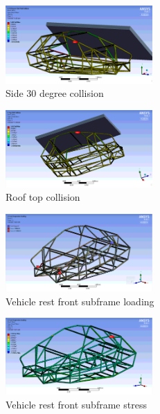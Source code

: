 \documentclass[10pt]{article}
\begin{document}
\begin{figure}[H]
\centering
\includegraphics[width=0.5\textwidth]{figures/fea/chassis/chassis-collision-side-30deg}
\caption{Side 30 degree collision}
\label{sec:chassis-collision-side-30deg}
\end{figure}

\begin{figure}[H]
\centering
\includegraphics[width=0.5\textwidth]{figures/fea/chassis/chassis-collision-top}
\caption{Roof top collision}
\label{sec:chassis-collision-top}
\end{figure}

\begin{figure}[H]
\centering
\includegraphics[width=0.5\textwidth]{figures/fea/chassis/chassis-front-suspension-rest-loading}
\caption{Vehicle rest front subframe loading}
\label{sec:chassis-front-suspension-rest-loading}
\end{figure}

\begin{figure}[H]
\centering
\includegraphics[width=0.5\textwidth]{figures/fea/chassis/chassis-front-suspension-stress}
\caption{Vehicle rest front subframe stress}
\label{sec:chassis-front-suspension-stress}
\end{figure}
\end{document}
